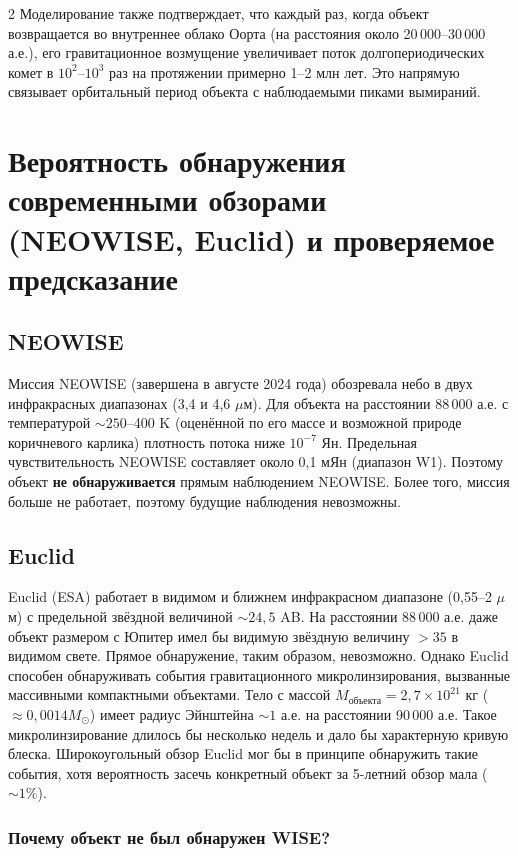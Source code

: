 \documentclass[11pt,a4paper]{article}
\begin{document}
\begin{multicols}{2}
		Моделирование также подтверждает, что каждый раз, когда объект возвращается во внутреннее облако Оорта (на расстояния около 20\,000–30\,000 а.е.), его гравитационное возмущение увеличивает поток долгопериодических комет в \(10^2\)–\(10^3\) раз на протяжении примерно 1–2 млн лет. Это напрямую связывает орбитальный период объекта с наблюдаемыми пиками вымираний.
		
		\section{Вероятность обнаружения современными обзорами (NEOWISE, Euclid) и проверяемое предсказание}
		
		\subsection{NEOWISE}
		
		Миссия NEOWISE (завершена в августе 2024 года) обозревала небо в двух инфракрасных диапазонах (3,4 и 4,6 \(\mu\)м). Для объекта на расстоянии 88\,000 а.е. с температурой \(\sim 250\)–400 K (оценённой по его массе и возможной природе коричневого карлика) плотность потока ниже \(10^{-7}\) Ян. Предельная чувствительность NEOWISE составляет около 0,1 мЯн (диапазон W1). Поэтому объект \textbf{не обнаруживается} прямым наблюдением NEOWISE. Более того, миссия больше не работает, поэтому будущие наблюдения невозможны.
		
		\subsection{Euclid}
		
		Euclid (ESA) работает в видимом и ближнем инфракрасном диапазоне (0,55–2 \(\mu\)м) с предельной звёздной величиной \(\sim 24,5\) AB. На расстоянии 88\,000 а.е. даже объект размером с Юпитер имел бы видимую звёздную величину \(>35\) в видимом свете. Прямое обнаружение, таким образом, невозможно. Однако Euclid способен обнаруживать события гравитационного микролинзирования, вызванные массивными компактными объектами. Тело с массой \(M_{\text{объекта}} = 2,7\times10^{21}\) кг (\(\approx 0,0014 M_{\odot}\)) имеет радиус Эйнштейна \(\sim 1\) а.е. на расстоянии 90\,000 а.е. Такое микролинзирование длилось бы несколько недель и дало бы характерную кривую блеска. Широкоугольный обзор Euclid мог бы в принципе обнаружить такие события, хотя вероятность засечь конкретный объект за 5-летний обзор мала (\(\sim 1\%\)).
		
		\subsubsection{Почему объект не был обнаружен WISE?}
		

\end{multicols}
\end{document}
